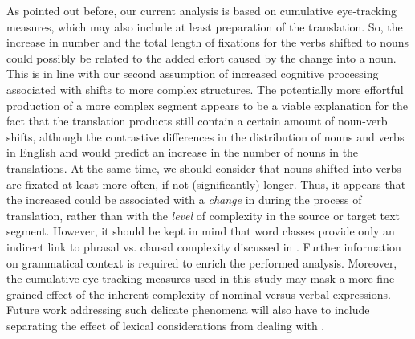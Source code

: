 \documentclass[output=paper]{LSP/langsci}
\begin{document}
As pointed out before, our current analysis is based on cumulative eye-tracking measures, which may also include at least preparation of the translation. So, the increase in number and the total length of fixations for the verbs shifted to nouns could possibly be related to the added effort caused by the change into a noun. This is in line with our second assumption of increased cognitive processing associated with shifts to more complex structures. The potentially more effortful production of a more complex segment appears to be a viable explanation for the fact that the translation products still contain a certain amount of noun-verb shifts, although the contrastive differences in the distribution of nouns and verbs in English and  would predict an increase in the number of nouns in the translations. At the same time, we should consider that nouns shifted into verbs are fixated at least more often, if not (significantly) longer. Thus, it appears that the increased  could be associated with a \textit{change} in  during the process of translation, rather than with the \textit{level} of complexity in the source or target text segment. However, it should be kept in mind that word classes provide only an indirect link to phrasal vs. clausal complexity discussed in . Further information on grammatical context is required to enrich the performed analysis. Moreover, the cumulative eye-tracking measures used in this study may mask a more fine-grained effect of the inherent complexity of nominal versus verbal expressions. Future work addressing such delicate phenomena will also have to include separating the effect of lexical considerations from dealing with .

\end{document}

